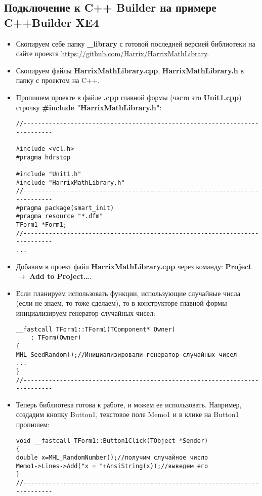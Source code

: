 \subsection{Подключение к C++ Builder на примере C++Builder XE4}
\begin{itemize}
\item Скопируем себе папку \textbf{\_library} с готовой последней версией библиотеки на сайте проекта \href{https://github.com/Harrix/HarrixMathLibrary}{https://github.com/Harrix/HarrixMathLibrary}.

\item Скопируем файлы \textbf{HarrixMathLibrary.cpp}, \textbf{HarrixMathLibrary.h} в папку с проектом на C++.

\item Пропишем проекте в файле \textbf{.cpp} главной формы (часто это \textbf{Unit1.cpp}) строчку \textbf{\#include "HarrixMathLibrary.h"}:
\begin{lstlisting}[label=install_code_04,caption=Подключение библиотеки]
//---------------------------------------------------------------------------

#include <vcl.h>
#pragma hdrstop

#include "Unit1.h"
#include "HarrixMathLibrary.h"
//---------------------------------------------------------------------------
#pragma package(smart_init)
#pragma resource "*.dfm"
TForm1 *Form1;
//---------------------------------------------------------------------------
...
\end{lstlisting}

\item Добавим в проект файл \textbf{HarrixMathLibrary.cpp} через команду: \textbf{Project} $\rightarrow$ \textbf{Add to Project\dots}.

\item Если планируем использовать функции, использующие случайные числа (если не знаем, то тоже сделаем), то в конструкторе главной формы инициализируем генератор случайных чисел:
\begin{lstlisting}[label=install_code_05,caption=Инициализация генератора случайных чисел]
__fastcall TForm1::TForm1(TComponent* Owner)
	: TForm(Owner)
{
MHL_SeedRandom();//Инициализировали генератор случайных чисел
...
}
//---------------------------------------------------------------------------
\end{lstlisting}

\item Теперь библиотека готова к работе, и можем ее использовать. Например, создадим кнопку Button1, текстовое поле Memo1 и в клике на Button1 пропишем:
\begin{lstlisting}[label=install_code_06,caption=Пример использования]
void __fastcall TForm1::Button1Click(TObject *Sender)
{
double x=MHL_RandomNumber();//получим случайное число
Memo1->Lines->Add("x = "+AnsiString(x));//выведем его
}
//---------------------------------------------------------------------------
\end{lstlisting}
\end{itemize}

